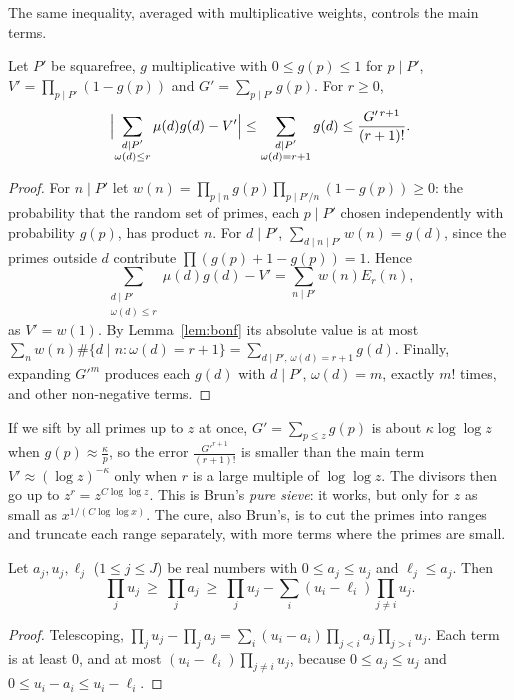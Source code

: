 The same inequality, averaged with multiplicative weights, controls the main terms.

\begin{lemma}\label{lem:bonfavg}
Let $P'$ be squarefree, $g$ multiplicative with $0\le g(p)\le1$ for $p\mid P'$, $V'=\prod_{p\mid P'}(1-g(p))$ and $G'=\sum_{p\mid P'}g(p)$. For $r\ge0$,
\[
\Bigl|\sum_{\substack{d\mid P'\\\omega(d)\le r}}\mu(d)g(d)-V'\Bigr|\le\sum_{\substack{d\mid P'\\\omega(d)=r+1}}g(d)\le\frac{G'^{\,r+1}}{(r+1)!}.
\]
\end{lemma}
\begin{proof}
For $n\mid P'$ let $w(n)=\prod_{p\mid n}g(p)\prod_{p\mid P'/n}(1-g(p))\ge0$: the probability that the random set of primes, each $p\mid P'$ chosen independently with probability $g(p)$, has product $n$. For $d\mid P'$, $\sum_{d\mid n\mid P'}w(n)=g(d)$, since the primes outside $d$ contribute $\prod(g(p)+1-g(p))=1$. Hence
\[
\sum_{\substack{d\mid P'\\\omega(d)\le r}}\mu(d)g(d)-V'=\sum_{n\mid P'}w(n)E_r(n),
\]
as $V'=w(1)$. By Lemma~\ref{lem:bonf} its absolute value is at most $\sum_nw(n)\#\{d\mid n:\omega(d)=r+1\}=\sum_{d\mid P',\,\omega(d)=r+1}g(d)$. Finally, expanding $G'^m$ produces each $g(d)$ with $d\mid P'$, $\omega(d)=m$, exactly $m!$ times, and other non-negative terms.
\end{proof}

If we sift by all primes up to $z$ at once, $G'=\sum_{p\le z}g(p)$ is about $\kappa\log\log z$ when $g(p)\approx\frac\kappa p$, so the error $\frac{G'^{r+1}}{(r+1)!}$ is smaller than the main term $V'\approx(\log z)^{-\kappa}$ only when $r$ is a large multiple of $\log\log z$. The divisors then go up to $z^r=z^{C\log\log z}$. This is Brun's \emph{pure sieve}: it works, but only for $z$ as small as $x^{1/(C\log\log x)}$. The cure, also Brun's, is to cut the primes into ranges and truncate each range separately, with more terms where the primes are small.

\begin{lemma}\label{lem:prodineq}
Let $a_j,u_j,\ell_j$ ($1\le j\le J$) be real numbers with $0\le a_j\le u_j$ and $\ell_j\le a_j$. Then
\[
\prod_ju_j\ \ge\ \prod_ja_j\ \ge\ \prod_ju_j-\sum_i(u_i-\ell_i)\prod_{j\ne i}u_j.
\]
\end{lemma}
\begin{proof}
Telescoping, $\prod_ju_j-\prod_ja_j=\sum_i(u_i-a_i)\prod_{j<i}a_j\prod_{j>i}u_j$. Each term is at least $0$, and at most $(u_i-\ell_i)\prod_{j\ne i}u_j$, because $0\le a_j\le u_j$ and $0\le u_i-a_i\le u_i-\ell_i$.
\end{proof}

